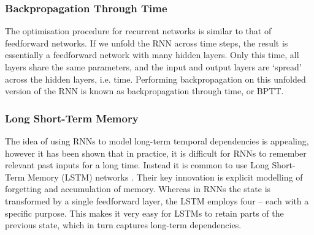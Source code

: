 \documentclass[../../report.tex]{subfiles}
\begin{document}

\subsubsection{Backpropagation Through Time}
The optimisation procedure for recurrent networks is similar to that of
feedforward networks. If we unfold the RNN across time steps, the result is
essentially a feedforward network with many\footnotemark{} hidden layers. Only
this time, all layers share the same parameters, and the input and output layers
are `spread' across the hidden layers, i.e. time. Performing backpropagation on
this unfolded version of the RNN is known as backpropagation through time, or
BPTT.



\subsubsection{Long Short-Term Memory}
The idea of using RNNs to model long-term temporal dependencies is appealing,
however it has been shown \cite{Bengio1994} that in practice, it is difficult
for RNNs to remember relevant past inputs for a long time. Instead it is common
to use Long Short-Term Memory (LSTM) networks \cite{Hochreiter1997}. Their key
innovation is explicit modelling of forgetting and accumulation of memory.
Whereas in RNNs the state is transformed by a single feedforward layer, the LSTM
employs four -- each with a specific purpose. This makes it very easy for LSTMs
to retain parts of the previous state, which in turn captures long-term
dependencies.

\end{document}
